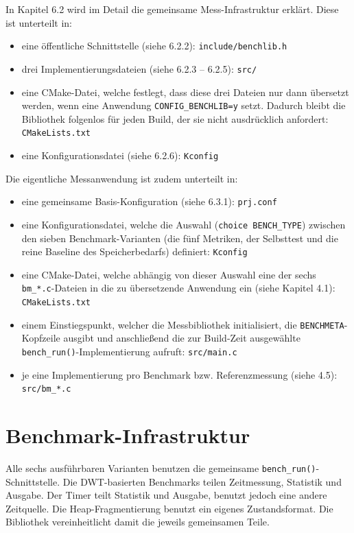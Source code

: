 In Kapitel 6.2 wird im Detail die gemeinsame Mess-Infrastruktur erkl{\"a}rt. Diese ist unterteilt in:

\begin{itemize}
\item eine {\"o}ffentliche Schnittstelle (siehe 6.2.2): \lstinline[style=fileinline]|include/benchlib.h|
\item drei Implementierungsdateien (siehe 6.2.3 -- 6.2.5): \lstinline[style=fileinline]|src/|
\item eine CMake-Datei, welche festlegt, dass diese drei Dateien nur dann {\"u}bersetzt werden, wenn eine Anwendung \lstinline[style=fileinline]|CONFIG_BENCHLIB=y| setzt. Dadurch bleibt die Bibliothek folgenlos f{\"u}r jeden Build, der sie nicht ausdr{\"u}cklich anfordert: \lstinline[style=fileinline]|CMakeLists.txt|
\item eine Konfigurationsdatei (siehe 6.2.6): \lstinline[style=fileinline]|Kconfig|
\end{itemize}
Die eigentliche Messanwendung ist zudem unterteilt in:

\begin{itemize}
\item eine gemeinsame Basis-Konfiguration (siehe 6.3.1): \lstinline[style=fileinline]|prj.conf|
\item eine Konfigurationsdatei, welche die Auswahl (\lstinline[style=fileinline]|choice BENCH_TYPE|) zwischen den sieben Benchmark-Varianten (die f{\"u}nf Metriken, der Selbsttest und die reine Baseline des Speicherbedarfs) definiert: \lstinline[style=fileinline]|Kconfig|
\item eine CMake-Datei, welche abh{\"a}ngig von dieser Auswahl eine der sechs \lstinline[style=fileinline]|bm_*.c|-Dateien in die zu {\"u}bersetzende Anwendung ein (siehe Kapitel 4.1): \lstinline[style=fileinline]|CMakeLists.txt|
\item einem Einstiegspunkt, welcher die Messbibliothek initialisiert, die \lstinline[style=fileinline]|BENCHMETA|-Kopfzeile ausgibt und anschlie{\ss}end die zur Build-Zeit ausgew{\"a}hlte \lstinline[style=fileinline]|bench_run()|-Implementierung aufruft: \lstinline[style=fileinline]|src/main.c|
\item je eine Implementierung pro Benchmark bzw. Referenzmessung (siehe 4.5): \lstinline[style=fileinline]|src/bm_*.c|
\end{itemize}
\section{Benchmark-Infrastruktur}
Alle sechs ausf{\"u}hrbaren Varianten benutzen die gemeinsame \lstinline[style=fileinline]|bench_run()|-Schnittstelle. Die DWT-basierten Benchmarks teilen Zeitmessung, Statistik und Ausgabe. Der Timer teilt Statistik und Ausgabe, benutzt jedoch eine andere Zeitquelle. Die Heap-Fragmentierung benutzt ein eigenes Zustandsformat. Die Bibliothek vereinheitlicht damit die jeweils gemeinsamen Teile.

